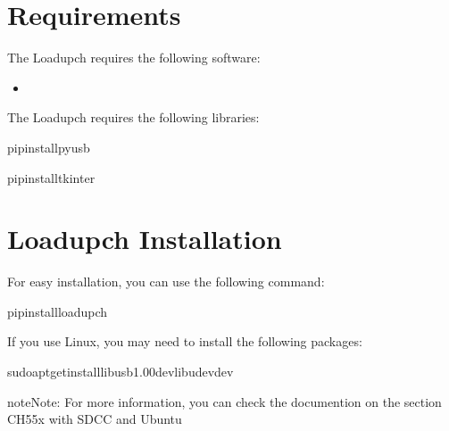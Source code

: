 \documentclass[letterpaper,10pt,english]{sphinxmanual}
\begin{document}
\section{Requirements}
\label{\detokenize{installation:requirements}}
\sphinxAtStartPar
The Loadupch requires the following software:
\begin{itemize}
\item {} 
\sphinxAtStartPar
{}

\end{itemize}

\sphinxAtStartPar
The Loadupch requires the following libraries:

\begin{sphinxVerbatim}[commandchars=\\\{\}]
pipinstallpyusb
\end{sphinxVerbatim}

\begin{sphinxVerbatim}[commandchars=\\\{\}]
pipinstalltkinter
\end{sphinxVerbatim}


\section{Loadupch Installation}
\label{\detokenize{installation:loadupch-installation}}
\sphinxAtStartPar
For easy installation, you can use the following command:

\begin{sphinxVerbatim}[commandchars=\\\{\}]
pipinstallloadupch
\end{sphinxVerbatim}

\sphinxAtStartPar
If you use Linux, you may need to install the following packages:

\begin{sphinxVerbatim}[commandchars=\\\{\}]
sudoapt\PYGZhy{}getinstalllibusb\PYGZhy{}1.0\PYGZhy{}0\PYGZhy{}devlibudev\PYGZhy{}dev
\end{sphinxVerbatim}

\begin{sphinxadmonition}{note}{Note:}
\sphinxAtStartPar
For more information, you can check the documention  on the section CH55x with SDCC and Ubuntu
\end{sphinxadmonition}
\end{document}
